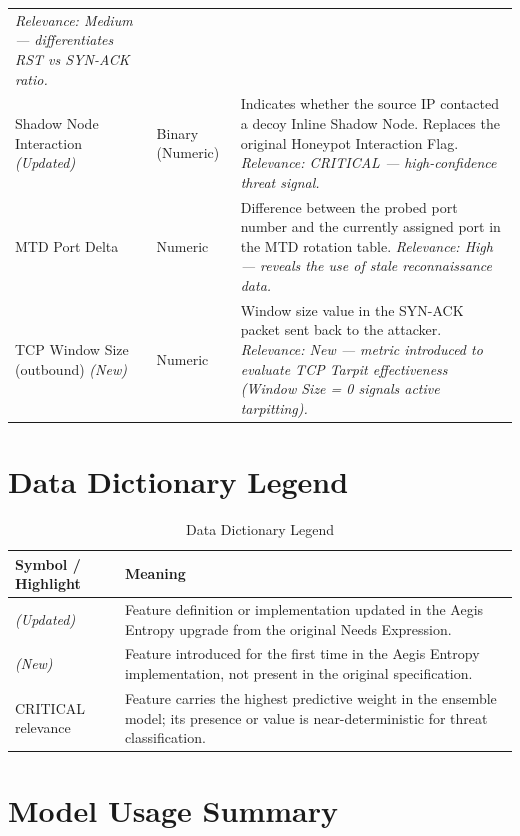 \documentclass[12pt,a4paper]{report}
\begin{document}
\begin{longtable}{@{}L{4cm} C{2cm} L{8.5cm}@{}}
      \textit{Relevance: Medium --- differentiates RST vs SYN-ACK ratio.} \\
  \addlinespace
  Shadow Node Interaction \textit{(Updated)}
    & Binary (Numeric)
    & Indicates whether the source IP contacted a decoy Inline Shadow Node.
      Replaces the original Honeypot Interaction Flag.
      \textit{Relevance: CRITICAL --- high-confidence threat signal.} \\
  \addlinespace
  MTD Port Delta
    & Numeric
    & Difference between the probed port number and the currently assigned port in
      the MTD rotation table.
      \textit{Relevance: High --- reveals the use of stale reconnaissance data.} \\
  \addlinespace
  TCP Window Size (outbound) \textit{(New)}
    & Numeric
    & Window size value in the SYN-ACK packet sent back to the attacker.
      \textit{Relevance: New --- metric introduced to evaluate TCP Tarpit effectiveness
      (Window Size = 0 signals active tarpitting).} \\
\end{longtable}

\section{Data Dictionary Legend}

\begin{table}[h!]
\centering
\caption{Data Dictionary Legend}
\begin{tabular}{@{}L{4cm} L{10.5cm}@{}}
  \toprule
  \textbf{Symbol / Highlight} & \textbf{Meaning} \\
  \midrule
  \textit{(Updated)}
    & Feature definition or implementation updated in the Aegis Entropy upgrade from
      the original Needs Expression. \\
  \addlinespace
  \textit{(New)}
    & Feature introduced for the first time in the Aegis Entropy implementation, not
      present in the original specification. \\
  \addlinespace
  CRITICAL relevance
    & Feature carries the highest predictive weight in the ensemble model; its presence
      or value is near-deterministic for threat classification. \\
  \bottomrule
\end{tabular}
\label{tab:legend}
\end{table}

\section{Model Usage Summary}
\end{document}
